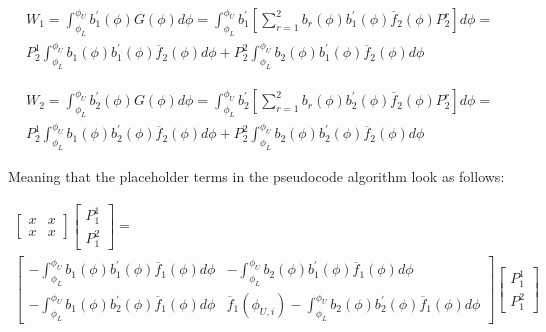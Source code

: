 \documentclass[12pt,a4paper,pagesize=pdftex]{scrartcl}
\begin{document}
\begin{multline*}
    W_1 = \int_{\phi_L}^{\phi_U} b_1^\prime\left(\phi\right) G\left(\phi\right) d\phi = \int_{\phi_L}^{\phi_U} b_1^\prime \left[ \sum_{r=1}^{2} b_r \left(\phi\right) b_1^\prime\left(\phi\right) \overline{f}_2\left(\phi\right) P_2^r \right] d\phi = \\
    P_2^1 \int_{\phi_L}^{\phi_U} b_1\left(\phi\right) b_1^\prime\left(\phi\right) \overline{f}_2\left(\phi\right) d\phi + P_2^2 \int_{\phi_L}^{\phi_U} b_2\left(\phi\right) b_1^\prime \left(\phi\right) \overline{f}_2\left(\phi\right) d\phi
\end{multline*}

\begin{multline*}
    W_2 = \int_{\phi_L}^{\phi_U} b_2^\prime\left(\phi\right) G\left(\phi\right) d\phi = \int_{\phi_L}^{\phi_U} b_2^\prime \left[ \sum_{r=1}^{2} b_r \left(\phi\right) b_2^\prime\left(\phi\right) \overline{f}_2\left(\phi\right) P_2^r \right] d\phi = \\
    P_2^1 \int_{\phi_L}^{\phi_U} b_1\left(\phi\right) b_2^\prime\left(\phi\right) \overline{f}_2\left(\phi\right) d\phi + P_2^2 \int_{\phi_L}^{\phi_U} b_2\left(\phi\right) b_2^\prime \left(\phi\right) \overline{f}_2\left(\phi\right) d\phi
\end{multline*}

Meaning that the placeholder terms in the pseudocode algorithm look as follows:

\begin{multline*}
    \begin{bmatrix}
        x & x \\
        x & x
    \end{bmatrix}
    \begin{bmatrix}
        P_1^1 \\
        P_1^2
    \end{bmatrix}
    = \\
    \begin{bmatrix}
        - \int_{\phi_L}^{\phi_U} b_1\left(\phi\right) b_1^\prime\left(\phi\right) \overline{f}_1\left(\phi\right) d\phi & - \int_{\phi_L}^{\phi_U} b_2\left(\phi\right) b_1^\prime\left(\phi\right) \overline{f}_1\left(\phi\right) d\phi \\
        - \int_{\phi_L}^{\phi_U} b_1\left(\phi\right) b_2^\prime\left(\phi\right) \overline{f}_1\left(\phi\right) d\phi & \overline{f}_1\left(\phi_{U,i}\right) - \int_{\phi_L}^{\phi_U} b_2\left(\phi\right) b_2^\prime\left(\phi\right) \overline{f}_1\left(\phi\right) d\phi
    \end{bmatrix}
    \begin{bmatrix}
        P_1^1 \\
        P_1^2
    \end{bmatrix}
\end{multline*}
\end{document}
